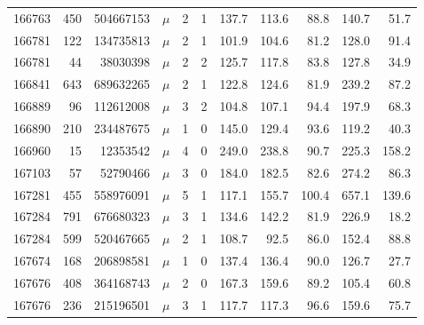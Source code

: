 \begin{table}[htb]
\begin{center}
\begin{tabular}{rrrrrrrrrrr}
166763 & 450 &  504667153 &  $\mu$ & 2 & 1 & 137.7 & 113.6 &  88.8 & 140.7 &  51.7\\
166781 & 122 &  134735813 &  $\mu$ & 2 & 1 & 101.9 & 104.6 &  81.2 & 128.0 &  91.4\\
166781 &  44 &   38030398 &  $\mu$ & 2 & 2 & 125.7 & 117.8 &  83.8 & 127.8 &  34.9\\
166841 & 643 &  689632265 &  $\mu$ & 2 & 1 & 122.8 & 124.6 &  81.9 & 239.2 &  87.2\\
166889 &  96 &  112612008 &  $\mu$ & 3 & 2 & 104.8 & 107.1 &  94.4 & 197.9 &  68.3\\
166890 & 210 &  234487675 &  $\mu$ & 1 & 0 & 145.0 & 129.4 &  93.6 & 119.2 &  40.3\\
166960 &  15 &   12353542 &  $\mu$ & 4 & 0 & 249.0 & 238.8 &  90.7 & 225.3 & 158.2\\
167103 &  57 &   52790466 &  $\mu$ & 3 & 0 & 184.0 & 182.5 &  82.6 & 274.2 &  86.3\\
167281 & 455 &  558976091 &  $\mu$ & 5 & 1 & 117.1 & 155.7 & 100.4 & 657.1 & 139.6\\
167284 & 791 &  676680323 &  $\mu$ & 3 & 1 & 134.6 & 142.2 &  81.9 & 226.9 &  18.2\\
167284 & 599 &  520467665 &  $\mu$ & 2 & 1 & 108.7 &  92.5 &  86.0 & 152.4 &  88.8\\
167674 & 168 &  206898581 &  $\mu$ & 1 & 0 & 137.4 & 136.4 &  90.0 & 126.7 &  27.7\\
167676 & 408 &  364168743 &  $\mu$ & 2 & 0 & 167.3 & 159.6 &  89.2 & 105.4 &  60.8\\
167676 & 236 &  215196501 &  $\mu$ & 3 & 1 & 117.7 & 117.3 &  96.6 & 159.6 &  75.7\\

	\hline
  \end{tabular}
\end{center}
\end{table}




